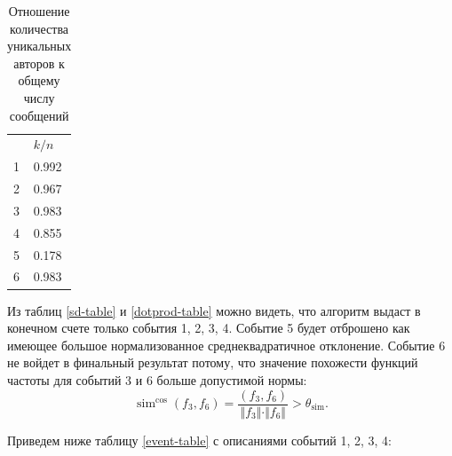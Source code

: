 \documentclass[12pt, a4paper]{article}
\DeclareMathOperator{\simu}{sim}
\begin{document}
	
	\begin{table}[H]
	\centering
	\caption{Отношение количества уникальных авторов к общему числу сообщений}
	\begin{tabular}{l | l}
	& $k/n$ \\ 
	1 & 0.992 \\ 
	2 & 0.967 \\ 
	3 & 0.983 \\ 
	4 & 0.855 \\ 
	5 & 0.178 \\ 
	6 & 0.983 \\ 
	\end{tabular}
	
	\label{spam-table}
	\end{table}
	
	Из таблиц \ref{sd-table} и \ref{dotprod-table} можно видеть, что алгоритм выдаст в конечном счете только события 1, 2, 3, 4. Событие 5 будет отброшено как имеющее большое нормализованное среднеквадратичное отклонение. Событие 6 не войдет в финальный результат потому, что значение похожести функций частоты для событий 3 и 6 больше допустимой нормы:
\begin{equation}
	\simu^{\cos}(f_{3}, f_{6}) = \frac{(f_{3}, f_{6})}{ \Vert f_{3} \Vert \cdot \Vert f_{6} \Vert} > \theta_{\simu}.
\end{equation}

Приведем ниже таблицу \ref{event-table} с описаниями событий 1, 2, 3, 4:
	
\end{document}
